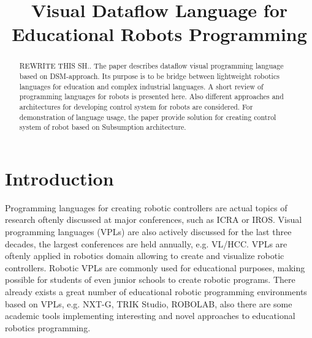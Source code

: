 \documentclass[conference,compsoc]{IEEEtran}
\begin{document}
\title{Visual Dataflow Language for Educational Robots Programming}

\author{
	
	\and

}

\maketitle



\begin{abstract}
REWRITE THIS SH..
The paper describes dataflow visual programming language based on DSM-approach. Its purpose is to be bridge between lightweight robotics languages for education and complex industrial languages. A short review of programming languages for robots is presented here. Also different approaches and architectures for developing control system for robots are considered. For demonstration of language usage, the paper provide solution for creating control system of robot based on Subsumption architecture. 
\end{abstract}

\section{Introduction}

Programming languages for creating robotic controllers are actual topics of research oftenly discussed at major conferences, such as ICRA\cite{Icra} or IROS\cite{Iros2016}. Visual programming languages (VPLs) are also actively discussed for the last three decades, the largest conferences are held annually, e.g. VL/HCC\cite{VLHCC}. VPLs are oftenly applied in robotics domain\cite{banyasad2000visual,simpson2006mobile,simpson2008visual,posso2011process,diprose2011ruru} allowing to create and visualize robotic controllers. Robotic VPLs are commonly used for educational purposes, making possible for students of even junior schools to create robotic programs. There already exists a great number of educational robotic programming environments based on VPLs, e.g. NXT-G\cite{nxtg}, TRIK Studio\cite{trik}, ROBOLAB\cite{robolab}, also there are some academic tools implementing interesting and novel approaches to educational robotics programming\cite{banyasad2000visual,simpson2008visual,diprose2011ruru}.
\end{document}
